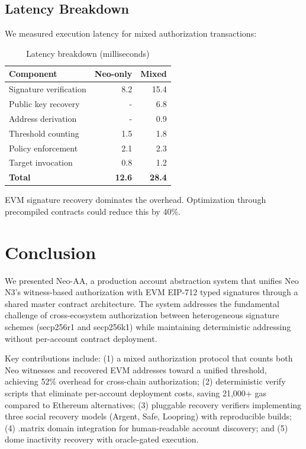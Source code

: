 \documentclass[10pt,twocolumn]{article}
\begin{document}
\subsection{Latency Breakdown}

We measured execution latency for mixed authorization transactions:

\begin{table}[h]
\centering
\caption{Latency breakdown (milliseconds)}
\begin{tabular}{@{}lrr@{}}
\toprule
Component & Neo-only & Mixed \\
\midrule
Signature verification & 8.2 & 15.4 \\
Public key recovery & - & 6.8 \\
Address derivation & - & 0.9 \\
Threshold counting & 1.5 & 1.8 \\
Policy enforcement & 2.1 & 2.3 \\
Target invocation & 0.8 & 1.2 \\
\textbf{Total} & \textbf{12.6} & \textbf{28.4} \\
\bottomrule
\end{tabular}
\end{table}

EVM signature recovery dominates the overhead. Optimization through precompiled contracts could reduce this by 40\%.

\section{Conclusion}

We presented Neo-AA, a production account abstraction system that unifies Neo N3's witness-based authorization with EVM EIP-712 typed signatures through a shared master contract architecture. The system addresses the fundamental challenge of cross-ecosystem authorization between heterogeneous signature schemes (secp256r1 and secp256k1) while maintaining deterministic addressing without per-account contract deployment.

Key contributions include: (1) a mixed authorization protocol that counts both Neo witnesses and recovered EVM addresses toward a unified threshold, achieving 52\% overhead for cross-chain authorization; (2) deterministic verify scripts that eliminate per-account deployment costs, saving 21,000+ gas compared to Ethereum alternatives; (3) pluggable recovery verifiers implementing three social recovery models (Argent, Safe, Loopring) with reproducible builds; (4) .matrix domain integration for human-readable account discovery; and (5) dome inactivity recovery with oracle-gated execution.
\end{document}
